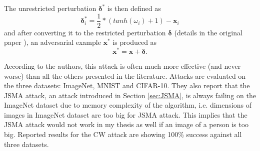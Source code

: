 The unrestricted perturbation $\pmb \delta^*$ is then defined as 
\[
	\pmb \delta^*_i = \frac{1}{2} * (tanh ( \omega_i) + 1) - \pmb x_i
\]
and after converting it to the restricted perturbation $\pmb \delta$ (details in the original paper \cite{DBLP:journals/corr/CarliniW16a}), an adversarial example $\pmb x^*$ is produced as 
\[
\pmb x^* = \pmb x +\pmb  \delta.
\]

According to the authors, this attack is often much more effective (and never worse) than all the others presented in the literature. Attacks are evaluated on the three datasets: ImageNet, MNIST and CIFAR-10. They also report that the JSMA attack, an attack introduced in Section \ref{sec:JSMA}, is always failing on the ImageNet dataset due to memory complexity of the algorithm, i.e. dimensions of images in ImageNet dataset are too big for JSMA attack. This implies that the JSMA attack would not work in my thesis as well if an image of a person is too big. Reported results for the CW attack are showing 100\% success against all three datasets.








